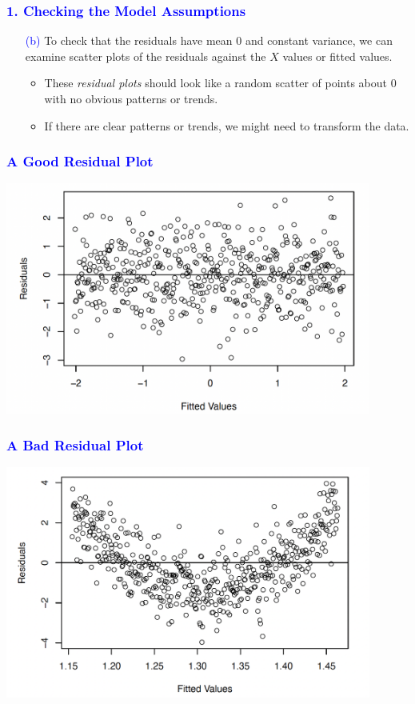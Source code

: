 \documentclass[12pt]{beamer}
\begin{document}
\begin{frame}
	\frametitle{\textcolor{blue}{1. Checking the Model Assumptions}}
	
	\begin{itemize}
		\item[\textcolor{blue}{(b)}] To check that the residuals have mean 0 and constant variance, we can examine scatter plots of the residuals against the $X$ values or fitted values.
		\begin{itemize}[label={\color{blue}$\blacktriangleright$}]
			\item These \textit{residual plots} should look like a random scatter of points about 0 with no obvious patterns or trends.
			\item If there are clear patterns or trends, we might need to transform the data.
		\end{itemize}
	\end{itemize}
	
\end{frame}
\begin{frame}
	\frametitle{\textcolor{blue}{A Good Residual Plot}}
	\centering
	\includegraphics[width=12cm]{goodresi.png}
\end{frame}
\begin{frame}
	\frametitle{\textcolor{blue}{A Bad Residual Plot}}
	\centering
	\includegraphics[width=12cm]{bad.png}
\end{frame}
\end{document}
